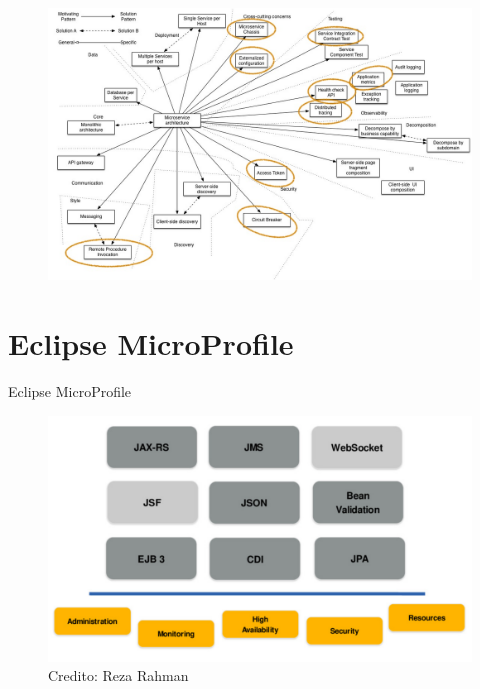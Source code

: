 \documentclass[aspectratio=169]{beamer}
\begin{document}
\begin{frame}{}
\begin{figure}
	\centering
	\includegraphics[width=\linewidth]{Images/PatternsRelatedToMicroservices2}
\end{figure}
\end{frame}



{
    \section{Eclipse MicroProfile}
}


\begin{frame}{Eclipse MicroProfile}
\begin{figure}
	\centering
	\includegraphics[width=0.8\linewidth]{Images/javaeemicropancake}
	\caption{Credito: Reza Rahman}
\end{figure}
\end{frame}
\end{document}
